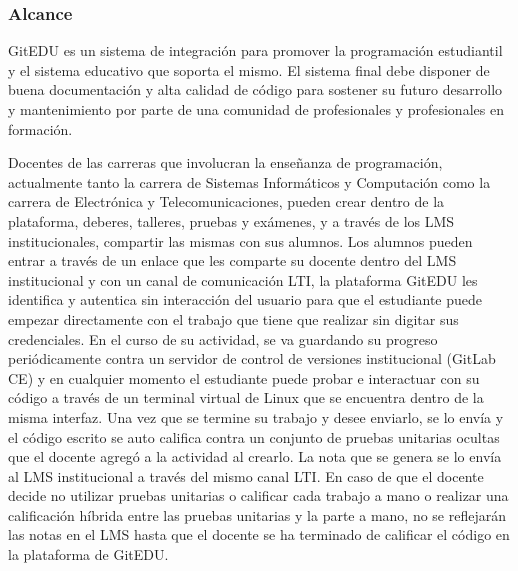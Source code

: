\subsubsection{Alcance}
GitEDU es un sistema de integración para promover la programación estudiantil y el sistema educativo que soporta el mismo. El sistema final debe disponer de buena documentación y alta calidad de código para sostener su futuro desarrollo y mantenimiento por parte de una comunidad de profesionales y profesionales en formación.

    
Docentes de las carreras que involucran la enseñanza de programación, actualmente tanto la carrera de Sistemas Informáticos y Computación como la carrera de Electrónica y Telecomunicaciones, pueden crear dentro de la plataforma, deberes, talleres, pruebas y exámenes, y a través de los LMS  institucionales, compartir las mismas con sus alumnos. Los alumnos pueden entrar a través de un enlace que les comparte su docente dentro del LMS  institucional y con un canal de comunicación LTI, la plataforma GitEDU les identifica y autentica sin interacción del usuario para que el estudiante puede empezar directamente con el trabajo que tiene que realizar sin digitar sus credenciales. En el curso de su actividad, se va guardando su progreso periódicamente contra un servidor de control de versiones institucional (GitLab CE) y en cualquier momento el estudiante puede probar e interactuar con su código a través de un terminal virtual de Linux que se encuentra dentro de la misma interfaz. Una vez que se termine su trabajo y desee enviarlo, se lo envía y el código escrito se auto califica contra un conjunto de pruebas unitarias ocultas que el docente agregó a la actividad al crearlo. La nota que se genera se lo envía al LMS  institucional a través del mismo canal LTI. En caso de que el docente decide no utilizar pruebas unitarias o calificar cada trabajo a mano o realizar una calificación híbrida entre las pruebas unitarias y la parte a mano, no se reflejarán las notas en el LMS  hasta que el docente se ha terminado de calificar el código en la plataforma de GitEDU.

